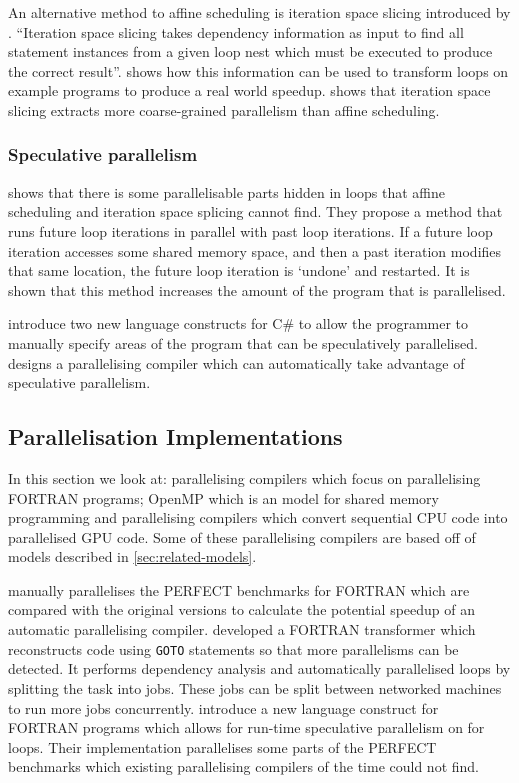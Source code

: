 \documentclass[conference]{IEEEtran}
\begin{document}
An alternative method to affine scheduling is iteration space slicing introduced by \textcite{Pugh1997}. ``Iteration space slicing takes dependency information as input to find all statement instances from a given loop nest which must be executed to produce the correct result''. \textcite{Pugh1997} shows how this information can be used to transform loops on example programs to produce a real world speedup. \textcite{Beletska2011} shows that iteration space slicing extracts more coarse-grained parallelism than affine scheduling.

\subsubsection{Speculative parallelism}
\textcite{Zhong2008} shows that there is some parallelisable parts hidden in loops that affine scheduling and iteration space splicing cannot find. They propose a method that runs future loop iterations in parallel with past loop iterations. If a future loop iteration accesses some shared memory space, and then a past iteration modifies that same location, the future loop iteration is `undone' and restarted. It is shown that this method increases the amount of the program that is parallelised.

\textcite{Prabhu2010} introduce two new language constructs for C\# to allow the programmer to manually specify areas of the program that can be speculatively parallelised. \textcite{Yiapanis2015} designs a parallelising compiler which can automatically take advantage of speculative parallelism.

\subsection{Parallelisation Implementations}
In this section we look at: parallelising compilers which focus on parallelising FORTRAN programs; OpenMP which is an model for shared memory programming and parallelising compilers which convert sequential CPU code into parallelised GPU code. Some of these parallelising compilers are based off of models described in \autoref{sec:related-models}.

\textcite{Eigenmann1998} manually parallelises the PERFECT benchmarks for FORTRAN which are compared with the original versions to calculate the potential speedup of an automatic parallelising compiler.
\textcite{DHollander1998} developed a FORTRAN transformer which reconstructs code using \texttt{GOTO} statements so that more parallelisms can be detected. It performs dependency analysis and automatically parallelised loops by splitting the task into jobs. These jobs can be split between networked machines to run more jobs concurrently.
\textcite{Rauchwerger1999} introduce a new language construct for FORTRAN programs which allows for run-time speculative parallelism on for loops. Their implementation parallelises some parts of the PERFECT benchmarks which existing parallelising compilers of the time could not find.
\end{document}

